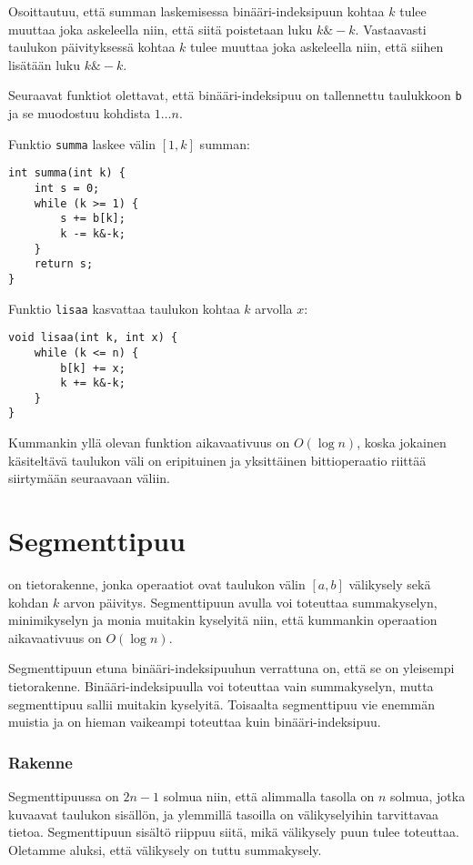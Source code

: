 Osoittautuu, että summan laskemisessa
binääri-indeksipuun kohtaa $k$ tulee muuttaa joka askeleella niin,
että siitä poistetaan luku $k \& -k$.
Vastaavasti taulukon päivityksessä kohtaa $k$ tulee muuttaa joka askeleella niin,
että siihen lisätään luku $k \& -k$.


Seuraavat funktiot olettavat, että binääri-indeksipuu on
tallennettu taulukkoon \texttt{b} ja se muodostuu kohdista $1 \ldots n$.

Funktio \texttt{summa} laskee välin $[1,k]$ summan:
\begin{lstlisting}
int summa(int k) {
    int s = 0;
    while (k >= 1) {
        s += b[k];
        k -= k&-k;
    }
    return s;
}
\end{lstlisting}
Funktio \texttt{lisaa} kasvattaa taulukon kohtaa $k$ arvolla $x$:
\begin{lstlisting}
void lisaa(int k, int x) {
    while (k <= n) {
        b[k] += x;
        k += k&-k;
    }
}
\end{lstlisting}

Kummankin yllä olevan funktion aikavaativuus on $O(\log n)$,
koska jokainen käsiteltävä taulukon väli on eripituinen
ja yksittäinen bittioperaatio riittää siirtymään
seuraavaan väliin.

\section{Segmenttipuu}


 on tietorakenne,
jonka operaatiot ovat taulukon välin $[a,b]$ välikysely
sekä kohdan $k$ arvon päivitys.
Segmenttipuun avulla voi toteuttaa summakyselyn,
minimikyselyn ja monia muitakin kyselyitä niin,
että kummankin operaation aikavaativuus on $O(\log n)$.

Segmenttipuun etuna binääri-indeksipuuhun verrattuna on,
että se on yleisempi tietorakenne.
Binääri-indeksipuulla voi toteuttaa vain summakyselyn,
mutta segmenttipuu sallii muitakin kyselyitä.
Toisaalta segmenttipuu vie enemmän muistia ja
on hieman vaikeampi toteuttaa kuin binääri-indeksipuu.

\subsubsection{Rakenne}

Segmenttipuussa on $2n-1$ solmua niin,
että alimmalla tasolla on $n$ solmua,
jotka kuvaavat taulukon sisällön,
ja ylemmillä tasoilla on välikyselyihin
tarvittavaa tietoa.
Segmenttipuun sisältö riippuu siitä,
mikä välikysely puun tulee toteuttaa.
Oletamme aluksi, että välikysely on tuttu summakysely.

